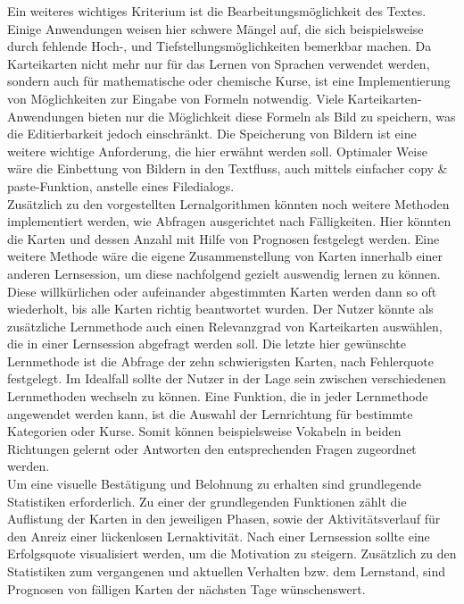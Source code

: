 \noindent Ein weiteres wichtiges Kriterium ist die Bearbeitungsmöglichkeit des Textes. Einige Anwendungen weisen hier schwere Mängel auf, die sich beispielsweise durch fehlende Hoch-, und Tiefstellungsmöglichkeiten bemerkbar machen. Da Karteikarten nicht mehr nur für das Lernen von Sprachen verwendet werden, sondern auch für mathematische oder chemische Kurse, ist eine Implementierung von Möglichkeiten zur Eingabe von Formeln notwendig. Viele Karteikarten-Anwendungen bieten nur die Möglichkeit diese Formeln als Bild zu speichern, was die Editierbarkeit jedoch einschränkt. Die Speicherung von Bildern ist eine weitere wichtige Anforderung, die hier erwähnt werden soll. Optimaler Weise wäre die Einbettung von Bildern in den Textfluss, auch mittels einfacher copy {\&} paste-Funktion, anstelle eines Filedialogs. \\

\noindent Zusätzlich zu den vorgestellten Lernalgorithmen könnten noch weitere Methoden implementiert werden, wie Abfragen ausgerichtet nach Fälligkeiten. Hier könnten die Karten und dessen Anzahl mit Hilfe von Prognosen festgelegt werden. Eine weitere Methode wäre die eigene Zusammenstellung von Karten innerhalb einer anderen Lernsession, um diese nachfolgend gezielt auswendig lernen zu können. Diese willkürlichen oder aufeinander abgestimmten Karten werden dann so oft wiederholt, bis alle Karten richtig beantwortet wurden. Der Nutzer könnte als zusätzliche Lernmethode auch einen Relevanzgrad von Karteikarten auswählen, die in einer Lernsession abgefragt werden soll. Die letzte hier gewünschte Lernmethode ist die Abfrage der zehn schwierigsten Karten, nach Fehlerquote festgelegt. Im Idealfall sollte der Nutzer in der Lage sein zwischen verschiedenen Lernmethoden wechseln zu können. Eine Funktion, die in jeder Lernmethode angewendet werden kann, ist die Auswahl der Lernrichtung für bestimmte Kategorien oder Kurse. Somit können beispielsweise Vokabeln in beiden Richtungen gelernt oder Antworten den entsprechenden Fragen zugeordnet werden. \\

\noindent Um eine visuelle Bestätigung und Belohnung zu erhalten sind grundlegende Statistiken erforderlich. Zu einer der grundlegenden Funktionen zählt die Auflistung der Karten in den jeweiligen Phasen, sowie der Aktivitätsverlauf für den Anreiz einer lückenlosen Lernaktivität. Nach einer Lernsession sollte eine Erfolgsquote visualisiert werden, um die Motivation zu steigern. Zusätzlich zu den Statistiken zum vergangenen und aktuellen Verhalten bzw. dem Lernstand, sind Prognosen von fälligen Karten der nächsten Tage wünschenswert. \\

